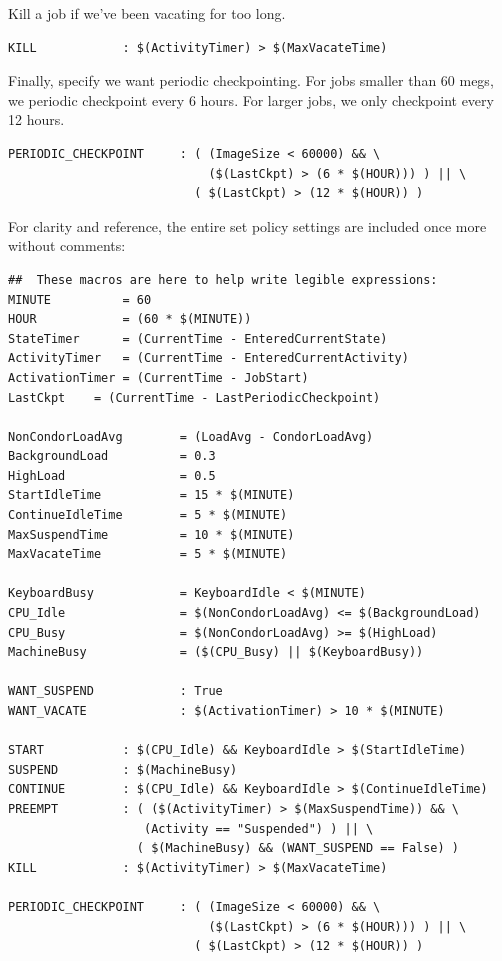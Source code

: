 Kill a job if we've been vacating for too long.
\begin{verbatim}
KILL            : $(ActivityTimer) > $(MaxVacateTime)
\end{verbatim}

Finally, specify we want periodic checkpointing.  
For jobs smaller than 60 megs, we periodic checkpoint every 6 hours.  
For larger jobs, we only checkpoint every 12 hours.
\begin{verbatim}
PERIODIC_CHECKPOINT     : ( (ImageSize < 60000) && \
                            ($(LastCkpt) > (6 * $(HOUR))) ) || \ 
                          ( $(LastCkpt) > (12 * $(HOUR)) )
\end{verbatim}

For clarity and reference, the entire set policy settings are included
once more without comments:

\begin{verbatim}
##  These macros are here to help write legible expressions:
MINUTE          = 60
HOUR            = (60 * $(MINUTE))
StateTimer      = (CurrentTime - EnteredCurrentState)
ActivityTimer   = (CurrentTime - EnteredCurrentActivity)
ActivationTimer = (CurrentTime - JobStart)
LastCkpt	= (CurrentTime - LastPeriodicCheckpoint)

NonCondorLoadAvg        = (LoadAvg - CondorLoadAvg)
BackgroundLoad          = 0.3
HighLoad                = 0.5
StartIdleTime           = 15 * $(MINUTE)
ContinueIdleTime        = 5 * $(MINUTE)
MaxSuspendTime          = 10 * $(MINUTE)
MaxVacateTime           = 5 * $(MINUTE)

KeyboardBusy            = KeyboardIdle < $(MINUTE)
CPU_Idle                = $(NonCondorLoadAvg) <= $(BackgroundLoad)
CPU_Busy                = $(NonCondorLoadAvg) >= $(HighLoad)
MachineBusy             = ($(CPU_Busy) || $(KeyboardBusy))

WANT_SUSPEND            : True
WANT_VACATE             : $(ActivationTimer) > 10 * $(MINUTE)

START           : $(CPU_Idle) && KeyboardIdle > $(StartIdleTime)
SUSPEND         : $(MachineBusy)
CONTINUE        : $(CPU_Idle) && KeyboardIdle > $(ContinueIdleTime)
PREEMPT	        : ( ($(ActivityTimer) > $(MaxSuspendTime)) && \
                   (Activity == "Suspended") ) || \
                  ( $(MachineBusy) && (WANT_SUSPEND == False) )
KILL            : $(ActivityTimer) > $(MaxVacateTime)

PERIODIC_CHECKPOINT     : ( (ImageSize < 60000) && \
                            ($(LastCkpt) > (6 * $(HOUR))) ) || \ 
                          ( $(LastCkpt) > (12 * $(HOUR)) )
\end{verbatim}

